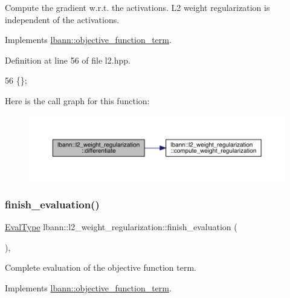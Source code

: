 Compute the gradient w.\+r.\+t. the activations. L2 weight regularization is independent of the activations. 

Implements \hyperlink{classlbann_1_1objective__function__term_ad009c3cfbe1cf2fbb6cce015b16fdac5}{lbann\+::objective\+\_\+function\+\_\+term}.



Definition at line 56 of file l2.\+hpp.


\begin{DoxyCode}
56 \{\};
\end{DoxyCode}
Here is the call graph for this function\+:\nopagebreak
\begin{figure}[H]
\begin{center}
\leavevmode
\includegraphics[width=350pt]{classlbann_1_1l2__weight__regularization_a64f5cd1a4a30727a81f112e51367700e_cgraph}
\end{center}
\end{figure}
\mbox{\label{classlbann_1_1l2__weight__regularization_a5517e1fa9da8a28f39cf208054f6138a}} 
\subsubsection{\texorpdfstring{finish\+\_\+evaluation()}{finish\_evaluation()}}
{\footnotesize\ttfamily \hyperlink{base_8hpp_a3266f5ac18504bbadea983c109566867}{Eval\+Type} lbann\+::l2\+\_\+weight\+\_\+regularization\+::finish\+\_\+evaluation (\begin{DoxyParamCaption}{ }\end{DoxyParamCaption})\hspace{0.3cm}{\ttfamily [override]}, {\ttfamily [virtual]}}

Complete evaluation of the objective function term. 

Implements \hyperlink{classlbann_1_1objective__function__term_a7a82f2cdbc954655ac860896306aed0c}{lbann\+::objective\+\_\+function\+\_\+term}.



